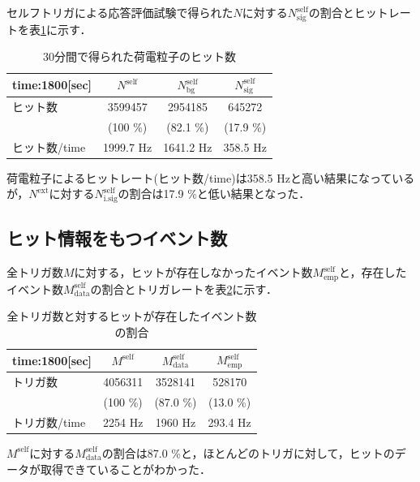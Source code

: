 セルフトリガによる応答評価試験で得られた$N$に対する$N_{\mathrm{sig}}^{\mathrm{self}}$の割合とヒットレートを表\ref{tab:selfp}に示す．
\begin{table}[h]
  \centering
  \caption{30分間で得られた荷電粒子のヒット数}
  \begin{tabular} {l|ccc} \hline
    time:1800[sec]& $N^{\mathrm{self}}$ & $N_{\mathrm{bg}}^{\mathrm{self}}$ & $N_{\mathrm{sig}}^{\mathrm{self}}$ \\ \hline \hline
    ヒット数 & 3599457 & 2954185 & 645272 \\
    & (100 \%) & (82.1 \%) & (17.9 \%) \\ \hline
    ヒット数/time & 1999.7 $\mathrm{Hz}$ & 1641.2 $\mathrm{Hz}$ & 358.5 $\mathrm{Hz}$ \\ \hline
  \end{tabular}
  \label{tab:selfp}
\end{table}

荷電粒子によるヒットレート(ヒット数/time)は358.5 $\mathrm{Hz}$と高い結果になっているが，$N^{\mathrm{ext}}$に対する$N_{\mathrm{i.sig}}^{\mathrm{self}}$の割合は17.9 \%と低い結果となった．

\subsection*{ヒット情報をもつイベント数}
全トリガ数$M$に対する，ヒットが存在しなかったイベント数$M_{\mathrm{emp}}^{\mathrm{self}}$と，存在したイベント数$M_{\mathrm{data}}^{\mathrm{self}}$の割合とトリガレートを表\ref{tab:selfr}に示す．

\begin{table}[h]
  \centering
  \caption{全トリガ数と対するヒットが存在したイベント数の割合}
  \begin{tabular} {l|ccc} \hline
    time:1800[sec] & $M^{\mathrm{self}}$ & $M_{\mathrm{data}}^{\mathrm{self}}$ & $M_{\mathrm{emp}}^{\mathrm{self}}$ \\ \hline \hline
    トリガ数 & 4056311 & 3528141 & 528170 \\
     & (100 \%) & (87.0 \%) & (13.0 \%) \\ \hline
    トリガ数/time & 2254 $\mathrm{Hz}$ & 1960 $\mathrm{Hz}$ & 293.4 $\mathrm{Hz}$ \\ \hline
  \end{tabular}
  \label{tab:selfr}
\end{table}

$M^{\mathrm{self}}$に対する$M_{\mathrm{data}}^{\mathrm{self}}$の割合は87.0 \%と，ほとんどのトリガに対して，ヒットのデータが取得できていることがわかった．

